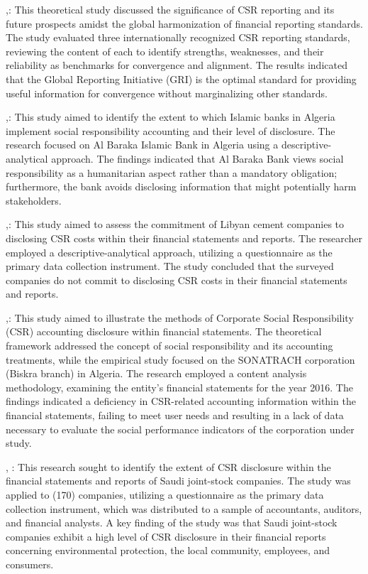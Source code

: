 \documentclass[10pt]{NSP1}
\begin{document}
\cite{ref28},: This theoretical study discussed the significance of CSR reporting and its future prospects amidst the global harmonization of financial reporting standards. The study evaluated three internationally recognized CSR reporting standards, reviewing the content of each to identify strengths, weaknesses, and their reliability as benchmarks for convergence and alignment. The results indicated that the Global Reporting Initiative (GRI) is the optimal standard for providing useful information for convergence without marginalizing other standards.

\cite{ref21},: This study aimed to identify the extent to which Islamic banks in Algeria implement social responsibility accounting and their level of disclosure. The research focused on Al Baraka Islamic Bank in Algeria using a descriptive-analytical approach. The findings indicated that Al Baraka Bank views social responsibility as a humanitarian aspect rather than a mandatory obligation; furthermore, the bank avoids disclosing information that might potentially harm stakeholders.

\cite{ref23},: This study aimed to assess the commitment of Libyan cement companies to disclosing CSR costs within their financial statements and reports. The researcher employed a descriptive-analytical approach, utilizing a questionnaire as the primary data collection instrument. The study concluded that the surveyed companies do not commit to disclosing CSR costs in their financial statements and reports.

\cite{ref10},: This study aimed to illustrate the methods of Corporate Social Responsibility (CSR) accounting disclosure within financial statements. The theoretical framework addressed the concept of social responsibility and its accounting treatments, while the empirical study focused on the SONATRACH corporation (Biskra branch) in Algeria. The research employed a content analysis methodology, examining the entity's financial statements for the year 2016. The findings indicated a deficiency in CSR-related accounting information within the financial statements, failing to meet user needs and resulting in a lack of data necessary to evaluate the social performance indicators of the corporation under study.

\cite{ref27}, : This research sought to identify the extent of CSR disclosure within the financial statements and reports of Saudi joint-stock companies. The study was applied to (170) companies, utilizing a questionnaire as the primary data collection instrument, which was distributed to a sample of accountants, auditors, and financial analysts. A key finding of the study was that Saudi joint-stock companies exhibit a high level of CSR disclosure in their financial reports concerning environmental protection, the local community, employees, and consumers.
\end{document}
